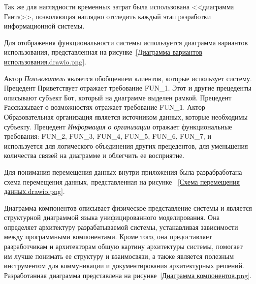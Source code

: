 
Так же для наглядности временных затрат была использована <<диаграмма Ганта>>,
позволяющая наглядно отследить каждый этап разработки информационной системы.



Для отображения функциональности системы используется диаграмма вариантов
использования, представленная на рисунке~\ref{Диаграмма вариантов использования.drawio.png}.

Актор \emph{Пользователь} является обобщением клиентов, которые использует 
систему. Прецедент Приветствует отражает требование FUN\_1. Этот и другие
прецеденты описывают субъект Бот, который на диаграмме выделен рамкой.
Прецедент Рассказывает о возможностях отражает требование FUN\_1.
Актор Образовательная организация является источником данных, которые 
необходимы субъекту. Прецедент \emph{Информация о организации} отражает
функциональные требования: FUN\_2, FUN\_3, FUN\_4, FUN\_5, FUN\_6, FUN\_7, и
используется для логического объединения других прецедентов, для уменьшения 
количества связей на диаграмме и облегчить ее восприятие.

Для понимания перемещения данных внутри приложения была разрабработана схема
перемещения данных, представленная на рисунке
~\ref{Схема перемещения данных.drawio.png}.


Диаграмма компонентов описывает физическое представление системы и является
структурной диаграммой языка унифицированного моделирования. Она определяет
архитектуру разрабатываемой системы, устанавливая зависимости между 
программными компонентами. Кроме того, она предоставляет разработчикам и
архитекторам общую картину архитектуры системы, помогает им лучше понимать ее
структуру и взаимосвязи, а также является полезным инструментом для
коммуникации и документирования архитектурных решений. Разработанная диаграмма
представлена на рисунке~\ref{Диаграмма компонентов.png}.



